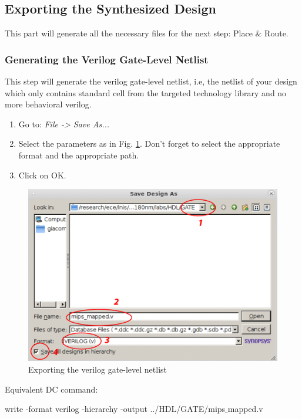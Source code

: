 \clearpage

\subsection{Exporting the Synthesized Design}
This part will generate all the necessary files for the next step: Place $\&$ Route.

\subsubsection{Generating the Verilog Gate-Level Netlist}
This step will generate the verilog gate-level netlist, i.e, the netlist of your design which only contains standard cell from the targeted technology library and no more behavioral verilog.

\begin{enumerate}
	\item Go to: \textit {File -> Save As...}
	\item Select the parameters as in Fig. \ref{fig_save_verilog}. Don't forget to select the appropriate format and the appropriate path.
	\item Click on OK.
\end{enumerate} 

\begin{figure}[!h]
	\centering
	\includegraphics[scale=0.5]{figures/lab3_design_compiler/save_verilog}
	\caption{Exporting the verilog gate-level netlist}
	\label{fig_save_verilog}
\end{figure}
Equivalent DC command: 

\begin{codeline}
write -format verilog -hierarchy -output ../HDL/GATE/mips$\_$mapped.v
\end{codeline}

